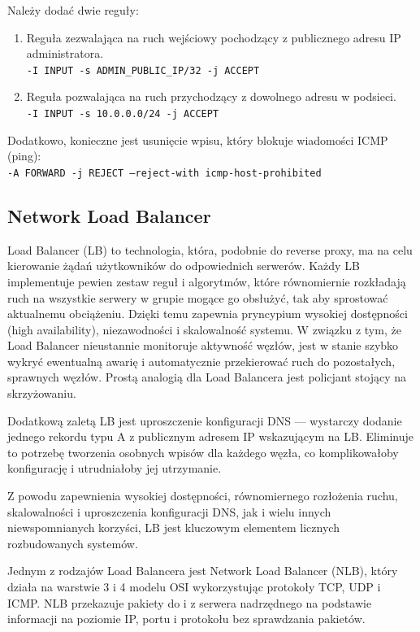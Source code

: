 \noindent Należy dodać dwie reguły:

\begin{enumerate}
    \item Reguła zezwalająca na ruch wejściowy pochodzący z publicznego adresu IP administratora.\\
    \texttt{-I INPUT -s ADMIN_PUBLIC_IP/32 -j ACCEPT}
    \item Reguła pozwalająca na ruch przychodzący z dowolnego adresu w podsieci.\\
    \texttt{-I INPUT -s 10.0.0.0/24 -j ACCEPT}
\end{enumerate}

\noindent Dodatkowo, konieczne jest usunięcie wpisu, który blokuje wiadomości ICMP (ping):\\
\texttt{-A FORWARD -j REJECT --reject-with icmp-host-prohibited}

\subsection{Network Load Balancer}

Load Balancer (LB) to technologia, która, podobnie do reverse proxy, ma na celu kierowanie żądań użytkowników do odpowiednich serwerów.
Każdy LB implementuje pewien zestaw reguł i algorytmów, które równomiernie rozkładają ruch na wszystkie serwery w grupie mogące go obsłużyć, tak aby sprostować aktualnemu obciążeniu.
Dzięki temu zapewnia pryncypium wysokiej dostępności (high availability), niezawodności i skalowalność systemu.
W związku z tym, że Load Balancer nieustannie monitoruje aktywność węzłów, jest w stanie szybko wykryć ewentualną awarię i automatycznie przekierować ruch do pozostałych, sprawnych węzłów.
Prostą analogią dla Load Balancera jest policjant stojący na skrzyżowaniu.

Dodatkową zaletą LB jest uproszczenie konfiguracji DNS --- wystarczy dodanie jednego rekordu typu A z publicznym adresem IP wskazującym na LB\@.
Eliminuje to potrzebę tworzenia osobnych wpisów dla każdego węzła, co komplikowałoby konfigurację i utrudniałoby jej utrzymanie.

Z powodu zapewnienia wysokiej dostępności, równomiernego rozłożenia ruchu, skalowalności i uproszczenia konfiguracji DNS, jak i wielu innych niewspomnianych korzyści, LB jest kluczowym elementem licznych rozbudowanych systemów.

Jednym z rodzajów Load Balancera jest Network Load Balancer (NLB), który działa na warstwie 3 i 4 modelu OSI wykorzystując protokoły TCP, UDP i ICMP\@.
NLB przekazuje pakiety do i z serwera nadrzędnego na podstawie informacji na poziomie IP, portu i protokołu bez sprawdzania pakietów.

